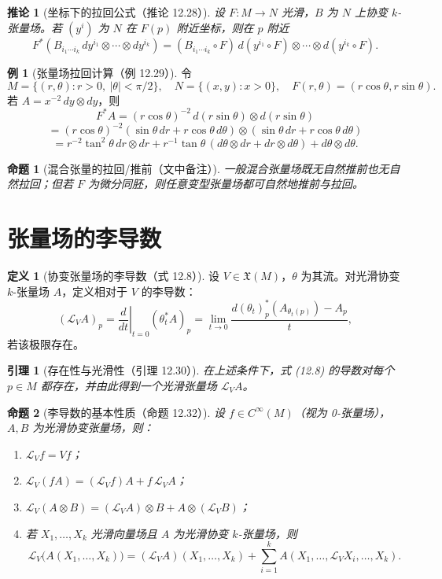 \documentclass[11pt]{article}
\theoremstyle{definition}
\newtheorem{definition}{定义}[section]
\newtheorem{example}{例}[section]
\theoremstyle{plain}
\newtheorem{proposition}{命题}[section]
\newtheorem{lemma}{引理}[section]
\newtheorem{corollary}{推论}[section]
\newcommand{\Cinf}{C^{\infty}}
\newcommand{\X}{\mathfrak{X}}
\newcommand{\Lie}{\mathcal{L}}
\newcommand{\ot}{\otimes}
\begin{document}
\begin{corollary}[坐标下的拉回公式（推论 12.28）]
设 $F:M\to N$ 光滑，$B$ 为 $N$ 上协变 $k$-张量场。若 $(y^i)$ 为 $N$ 在 $F(p)$ 附近坐标，则在 $p$ 附近
\[
F^*\!\left(B_{i_1\cdots i_k}\,dy^{i_1}\ot\cdots\ot dy^{i_k}\right)
=(B_{i_1\cdots i_k}\circ F)\,d(y^{i_1}\circ F)\ot\cdots\ot d(y^{i_k}\circ F).
\]
\end{corollary}

\begin{example}[张量场拉回计算（例 12.29）]
令
\[
M=\{(r,\theta):r>0,\ |\theta|<\pi/2\},\quad N=\{(x,y):x>0\},
\quad F(r,\theta)=(r\cos\theta,r\sin\theta).
\]
若 $A=x^{-2}\,dy\ot dy$，则
\[
F^*A=(r\cos\theta)^{-2}\,d(r\sin\theta)\ot d(r\sin\theta)
\]
\[
=(r\cos\theta)^{-2}(\sin\theta\,dr+r\cos\theta\,d\theta)\ot(\sin\theta\,dr+r\cos\theta\,d\theta)
\]
\[
=r^{-2}\tan^2\theta\,dr\ot dr
+r^{-1}\tan\theta\,(d\theta\ot dr+dr\ot d\theta)
+d\theta\ot d\theta.
\]
\end{example}

\begin{proposition}[混合张量的拉回/推前（文中备注）]
一般混合张量场既无自然推前也无自然拉回；但若 $F$ 为微分同胚，则任意变型张量场都可自然地推前与拉回。
\end{proposition}

\section{张量场的李导数}

\begin{definition}[协变张量场的李导数（式 12.8）]
设 $V\in\X(M)$，$\theta$ 为其流。对光滑协变 $k$-张量场 $A$，定义相对于 $V$ 的李导数：
\[
(\Lie_VA)_p=\left.\frac{d}{dt}\right|_{t=0}(\theta_t^*A)_p
=\lim_{t\to 0}\frac{d(\theta_t)_p^*(A_{\theta_t(p)})-A_p}{t},
\]
若该极限存在。
\end{definition}

\begin{lemma}[存在性与光滑性（引理 12.30）]
在上述条件下，式 (12.8) 的导数对每个 $p\in M$ 都存在，并由此得到一个光滑张量场 $\Lie_VA$。
\end{lemma}

\begin{proposition}[李导数的基本性质（命题 12.32）]
设 $f\in\Cinf(M)$（视为 0-张量场），$A,B$ 为光滑协变张量场，则：
\begin{enumerate}[label=(\alph*),leftmargin=2em]
\item $\Lie_V f=Vf$；
\item $\Lie_V(fA)=(\Lie_V f)A+f\,\Lie_VA$；
\item $\Lie_V(A\ot B)=(\Lie_VA)\ot B+A\ot(\Lie_VB)$；
\item 若 $X_1,\dots,X_k$ 光滑向量场且 $A$ 为光滑协变 $k$-张量场，则
\[
\Lie_V\big(A(X_1,\dots,X_k)\big)
=(\Lie_VA)(X_1,\dots,X_k)
+\sum_{i=1}^k A(X_1,\dots,\Lie_VX_i,\dots,X_k).
\]
\end{enumerate}
\end{proposition}
\end{document}

